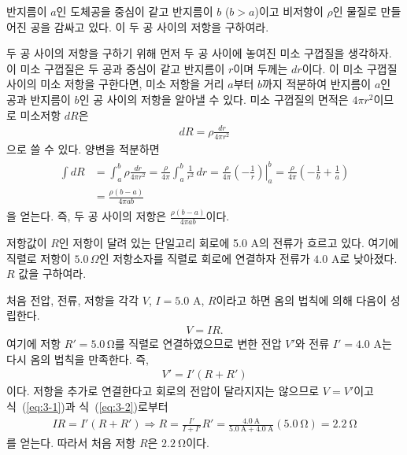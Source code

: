 \documentclass[tightenlines,floatfix,nofootinbib,superscriptaddress,fleqn]{revtex4}
\begin{document}
 반지름이 $a$인 도체공을 중심이 같고
반지름이 $b$ ($b>a$)이고 비저항이 $\rho$인 물질로 만들어진 공을 감싸고
있다. 이 두 공 사이의 저항을 구하여라.  

\vspace{0.5cm}

두 공 사이의 저항을 구하기 위해 먼저 두 공 사이에 놓여진 미소 구껍질을 생각하자. 이 미소 구껍질은
두 공과 중심이 같고 반지름이 $r$이며 두께는 $dr$이다. 이 미소 구껍질 사이의 미소 저항을 구한다면,
미소 저항을 거리 $a$부터 $b$까지 적분하여 반지름이 $a$인 공과 반지름이 $b$인 공 사이의 저항을
알아낼 수 있다. 미소 구껍질의 면적은 $4\pi r^2$이므로 미소저항 $dR$은
\begin{align}
  dR = \rho\frac{dr}{4\pi r^2}
\end{align}
으로 쓸 수 있다. 양변을 적분하면
\begin{align}
  \begin{split}
    \int dR &= \int^b_a  \rho\frac{dr}{4\pi r^2}
    =\frac{\rho}{4\pi}\int^b_a\frac{1}{r^2}\,dr
    =\frac{\rho}{4\pi}\left.\left(-\frac{1}{r}\right)\right|^{b}_{a}
    =\frac{\rho}{4\pi}\left(
      -\frac{1}{b}+\frac{1}{a}
      \right) \\
    &= \frac{\rho(b-a)}{4\pi ab}
    \end{split}
\end{align}
을 얻는다. 즉, 두 공 사이의 저항은 $\frac{\rho(b-a)}{4\pi ab}$이다.
\vspace{0.5cm}

저항값이 $R$인 저항이 달려 있는 단일고리
회로에 5.0 A의 전류가 흐르고 있다. 여기에 직렬로 저항이 $5.0\,\Omega$인
저항소자를 직렬로 회로에 연결하자 전류가 $4.0$ A로 낮아졌다. $R$ 값을
구하여라.   

\vspace{0.5cm}

처음 전압, 전류, 저항을 각각 $V$, $I=5.0$ A, $R$이라고 하면 옴의 법칙에 의해 다음이 성립한다.
\begin{align}\label{eq:3-1}
  V = IR.
\end{align}
여기에 저항 $R'=5.0\,\mathrm{\Omega}$를 직렬로 연결하였으므로 변한 전압 $V'$와 전류 $I'=4.0$
A는 다시 옴의 법칙을 만족한다. 즉,
\begin{align}\label{eq:3-2}
  V' = I'(R+R')
\end{align} 
이다. 저항을 추가로 연결한다고 회로의 전압이 달라지지는 않으므로 $V=V'$이고 식~(\ref{eq:3-1})과
식~(\ref{eq:3-2})로부터
\begin{align}
  IR=I'(R+R')\Longrightarrow
  R = \frac{I'}{I+I'}R'=\frac{4.0~\mathrm{A}}{5.0~\mathrm{A}+4.0~\mathrm{A}}
  (5.0~\mathrm{\Omega})=2.2~\mathrm{\Omega}
\end{align}
를 얻는다. 따라서 처음 저항 $R$은 $2.2~\mathrm{\Omega}$이다.
\vspace{0.5cm}
\end{document}

